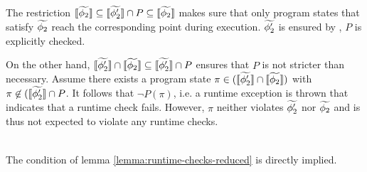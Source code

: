 \begin{proofatend}~\\
    The restriction $\llbracket {\widetilde{\phi_2}} \rrbracket \subseteq \llbracket {\widetilde{\phi_2'}} \rrbracket \cap P \subseteq \llbracket {\widetilde{\phi_2}} \rrbracket$ makes sure that only program states that satisfy $\widetilde{\phi_2}$ reach the corresponding point during execution.
    $\widetilde{\phi_2'}$ is ensured by , $P$ is explicitly checked.
    
    On the other hand, $\llbracket {\widetilde{\phi_2'}} \rrbracket \cap \llbracket {\widetilde{\phi_2}} \rrbracket \subseteq \llbracket {\widetilde{\phi_2'}} \rrbracket \cap P$ ensures that $P$ is not stricter than necessary.
    Assume there exists a program state $\pi \in (\llbracket {\widetilde{\phi_2'}} \rrbracket \cap \llbracket {\widetilde{\phi_2}} \rrbracket)$ with $\pi \not \in (\llbracket {\widetilde{\phi_2'}} \rrbracket \cap P$.
    It follows that $\neg P(\pi)$, i.e. a runtime exception is thrown that indicates that a runtime check fails.
    However, $\pi$ neither violates $\widetilde{\phi_2'}$ nor $\widetilde{\phi_2}$ and is thus not expected to violate any runtime checks.
\end{proofatend}

\begin{proofatend}~\\
    The condition of lemma \ref{lemma:runtime-checks-reduced} is directly implied.
\end{proofatend}

